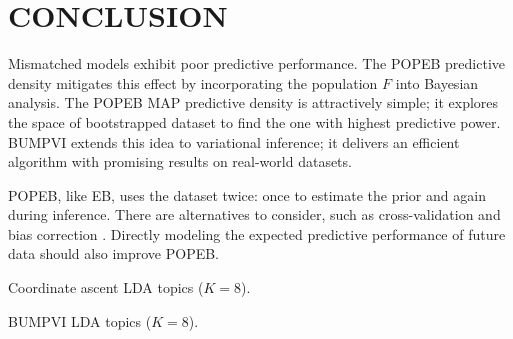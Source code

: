 
\section{CONCLUSION}
\label{sec:conclusion}

Mismatched models exhibit poor predictive performance. The \gls{POPEB} predictive
density mitigates this effect by incorporating the population $F$ into
Bayesian analysis. The \gls{POPEB} \gls{MAP} predictive density is attractively
simple; it explores the space of bootstrapped dataset to find the one with
highest predictive power. \gls{BUMPVI} extends this idea to variational
inference; it delivers an efficient algorithm with promising results on
real-world datasets.

\gls{POPEB}, like \gls{EB}, uses the dataset twice:
once to estimate the prior and again during inference. There are alternatives to
consider, such as cross-validation and bias correction
\citep{Efron:1997,gelman2013understanding}.
Directly modeling the expected predictive performance of future data should also
improve \gls{POPEB}.

\begin{table}[!htb]
\caption{Coordinate ascent \gls{LDA} topics ($K=8$).}
\label{tab:coordinate_ascent}
\begin{center}
{\fontsize{8pt}{8pt}\selectfont

}
\end{center}
\end{table}

\begin{table}[!hbt]
\caption{\gls{BUMPVI} \gls{LDA} topics ($K=8$).}
\label{tab:bumping}
\begin{center}
{\fontsize{8pt}{8pt}\selectfont

}
\end{center}
\end{table}
